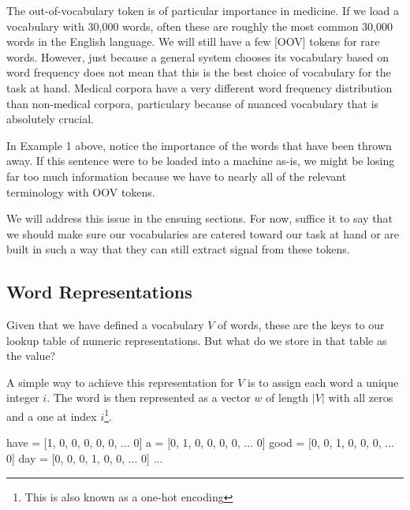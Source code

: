 The out-of-vocabulary token is of particular importance in medicine. If we load a vocabulary with 30,000 words, often these are roughly the most common 30,000 words in the English language. We will still have a few [OOV] tokens
for rare words. However, just because a general system chooses its vocabulary based on word frequency does not mean that this is the best choice of vocabulary for the task at hand. Medical corpora have a very different word frequency
distribution than non-medical corpora, particulary because of nuanced vocabulary that is absolutely crucial.


In Example 1 above, notice the importance of the words that have been thrown away. If this sentence were to be loaded into a machine as-is, we might be losing far too much information because we have to nearly all of the relevant terminology with OOV tokens.

We will address this issue in the ensuing sections. For now, suffice it to say that we should make sure our vocabularies are catered toward our task at hand or are built in such a way that they can still extract signal from these tokens.

\subsection{Word Representations}

Given that we have defined a vocabulary $V$ of words, these are the keys to our lookup table of numeric representations. But what do we store in that table as the value?

A simple way to achieve this representation for $V$ is to assign each word a unique integer $i$.
The word is then represented as a vector $w$ of length $|V|$ with all zeros and a one at index $i$\footnote{This is also known as a one-hot encoding}.

\begin{python}
  have = [1, 0, 0, 0, 0, 0, ... 0]
  a    = [0, 1, 0, 0, 0, 0, ... 0]
  good = [0, 0, 1, 0, 0, 0, ... 0]
  day  = [0, 0, 0, 1, 0, 0, ... 0]
  ...
\end{python}

